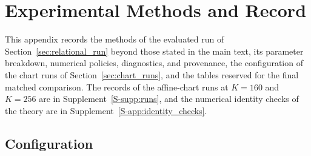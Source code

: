 \documentclass[twoside,11pt]{article}
\begin{document}

\section{Experimental Methods and Record}
\label{app:experimental_methods}
\label{app:placeholder_experimental_record}

This appendix records the methods of the evaluated run of Section~\ref{sec:relational_run} beyond those stated in the main text, its parameter breakdown, numerical policies, diagnostics, and provenance, the configuration of the chart runs of Section~\ref{sec:chart_runs}, and the tables reserved for the final matched comparison. The records of the affine-chart runs at $K=160$ and $K=256$ are in Supplement~\ref{S-supp:runs}, and the numerical identity checks of the theory are in Supplement~\ref{S-app:identity_checks}.

\subsection{Configuration}
\label{app:run_configuration}
\end{document}
